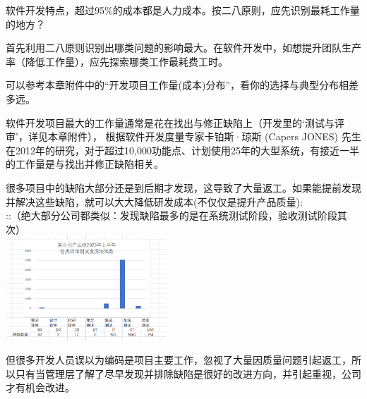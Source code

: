 软件开发特点，超过95\%的成本都是人力成本。按二八原则，应先识别最耗工作量的地方？

首先利用二八原则识别出哪类问题的影响最大。在软件开发中，如想提升团队生产率（降低工作量），应先探索哪类工作最耗费工时。


可以参考本章附件中的“开发项目工作量(成本)分布”，看你的选择与典型分布相差多远。

软件开发项目最大的工作量通常是花在找出与修正缺陷上（开发里的`测试与评审'，详见本章附件），
根据软件开发度量专家卡铂斯·琼斯 (Capers JONES)
先生在2012年的研究，对于超过10,000功能点、计划使用25年的大型系统，有接近一半的工作量是与找出并修正缺陷相关。

很多项目中的缺陷大部分还是到后期才发现，这导致了大量返工。如果能提前发现并解决这些缺陷，就可以大大降低研发成本(不仅仅是提升产品质量):\\
::（绝大部分公司都类似：发现缺陷最多的是在系统测试阶段，验收测试阶段其次）\\


\includegraphics[width=6cm]{微信截图_20231023085822.png}


但很多开发人员误以为编码是项目主要工作，忽视了大量因质量问题引起返工，所以只有当管理层了解了尽早发现并排除缺陷是很好的改进方向，并引起重视，公司才有机会改进。

